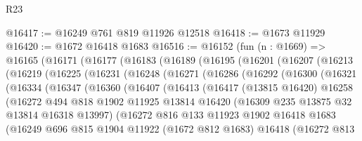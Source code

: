 \begin{lexlean}{R23}
\begin{coremodule}
@16417 := @16249 @761 @819 @11926 @12518
@16418 := @1673 @11929
@16420 := @1672 @16418 @1683
@16516 := @16152
    (fun (n : @1669) =>
    @16165
      (@16171
        (@16177
          (@16183
            (@16189
              (@16195
                (@16201
                  (@16207
                    (@16213
                      (@16219
                        (@16225
                          (@16231
                            (@16248
                              (@16271
                                (@16286
                                  (@16292
                                    (@16300
                                      (@16321
                                        (@16334
                                          (@16347
                                            (@16360
                                              (@16407
                                                (@16413
                                                  (@16417
                                                    (@13815 @16420)
                                                    @16258
                                                    (@16272
                                                      @494
                                                      @818
                                                      @1902
                                                      @11925
                                                      @13814
                                                      @16420
                                                      (@16309 @235 @13875 @32 @13814 @16318 @13997)
                                                      (@16272
                                                        @816
                                                        @133
                                                        @11923
                                                        @1902
                                                        @16418
                                                        @1683
                                                        (@16249
                                                          @696
                                                          @815
                                                          @1904
                                                          @11922
                                                          (@1672 @812 @1683)
                                                          @16418
                                                          (@16272
                                                            @813

\end{coremodule}
\end{lexlean}
